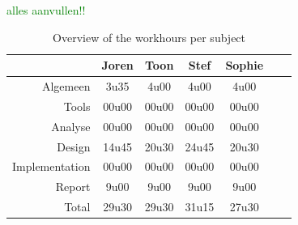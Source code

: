 \documentclass[i2]{oss}
\newcommand{\comment}[1]{{\huge \textcolor{green}{#1}}\\}
\begin{document}
\comment{alles aanvullen!!}
\begin{table}[h!]
\begin{center}
    \begin{tabular}{ r | c  c  c  c  c  c}
     & Joren & Toon & Stef & Sophie \\ \hline
    Algemeen & 3u35 & 4u00 & 4u00 & 4u00\\
           Tools & 00u00 & 00u00 & 00u00 & 00u00 \\
        Analyse & 00u00 & 00u00 & 00u00 & 00u00 \\
        Design & 14u45 & 20u30 & 24u45 & 20u30 \\
        Implementation & 00u00 & 00u00 & 00u00 & 00u00\\
        Report & 9u00 & 9u00 & 9u00 & 9u00 \\
        Total & 29u30 & 29u30 & 31u15 & 27u30  
    \end{tabular}
    \caption{Overview of the workhours per subject}
    \label{tab:werkuren}
\end{center}
\end{table}
\end{document}
